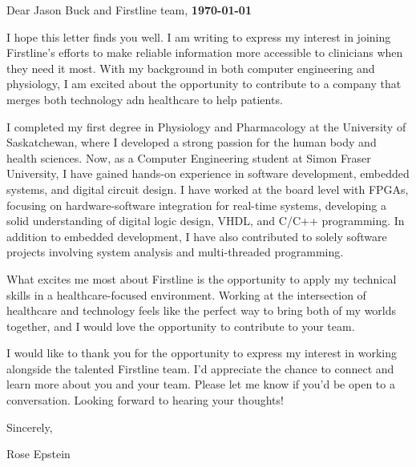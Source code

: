 \documentclass[letterpaper,11pt]{article}
\begin{document}
    \vspace*{10pt}
    \par Dear Jason Buck and Firstline team,  \hfill \textbf{\today}
    \vspace*{10pt}
    \par I hope this letter finds you well. I am writing to express my interest in joining Firstline's efforts to make reliable information more accessible to clinicians when they need it most.
    With my background in both computer engineering and physiology, I am excited about the opportunity to contribute to a company that merges both technology adn healthcare to help patients.
    \vspace*{10pt}
    \par I completed my first degree in Physiology and Pharmacology at the University of Saskatchewan, where I developed a strong passion for the human body and health sciences. 
    Now, as a Computer Engineering student at Simon Fraser University, I have gained hands-on experience in software development, embedded systems, and digital circuit design. 
    I have worked at the board level with FPGAs, focusing on hardware-software integration for real-time systems, developing a solid understanding of digital logic design, VHDL, and C/C++ programming. 
    In addition to embedded development, I have also contributed to solely software projects involving system analysis and multi-threaded programming.
    \vspace*{10pt}
    \par What excites me most about Firstline is the opportunity to apply my technical skills in a healthcare-focused environment.
    Working at the intersection of healthcare and technology feels like the perfect way to bring both of my worlds together, and I would love the opportunity to contribute to your team.
    \vspace{10pt}
    \par I would like to thank you for the opportunity to express my interest in working alongside the talented Firstline team. 
    I'd appreciate the chance to connect and learn more about you and your team. Please let me know if you'd be open to a conversation. Looking forward to hearing your thoughts!
    \vspace*{10pt}
    \par Sincerely,
    \par Rose Epstein
\end{document}
